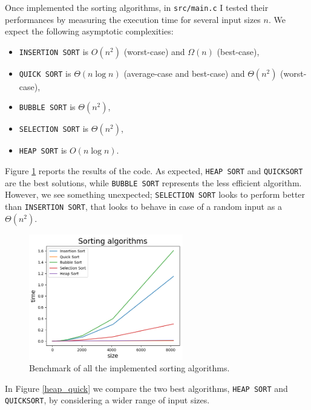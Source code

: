 \documentclass{article}
\begin{document}
	\noindent Once implemented the sorting algorithms, in \texttt{src/main.c} I tested their performances by measuring the execution time for several input sizes $n$. We expect the following asymptotic complexities:
	\begin{itemize}
		\item \texttt{INSERTION SORT} is $O(n^2)$ (worst-case) and $\Omega(n)$ (best-case), 
		\item  \texttt{QUICK SORT} is $\Theta(n\log n)$ (average-case and best-case) and $\Theta(n^2)$ (worst-case),
		\item \texttt{BUBBLE SORT} is $\Theta(n^2)$,
		\item \texttt{SELECTION SORT} is $\Theta(n^2)$,
		\item \texttt{HEAP SORT} is $O(n\log n)$.
	\end{itemize}
	Figure \ref*{sortings} reports the results of the code. As expected, \texttt{HEAP SORT} and \texttt{QUICKSORT} are the best solutions, while \texttt{BUBBLE SORT} represents the less efficient algorithm. However, we see something unexpected; \texttt{SELECTION SORT} looks to perform better than \texttt{INSERTION SORT}, that looks to behave in case of a random input as a $\Theta(n^2)$. 
	\newpage
	\begin{figure}[t]
		\centering
		\includegraphics[width=0.6\textwidth]{../plots/sorting_plot.png}  
		\caption{Benchmark of all the implemented sorting algorithms.}
		\label{sortings}
	\end{figure}
	\noindent In Figure \ref{heap_quick} we compare the two best algorithms, \texttt{HEAP SORT} and \texttt{QUICKSORT}, by considering a wider range of input sizes. 
	
\end{document}
